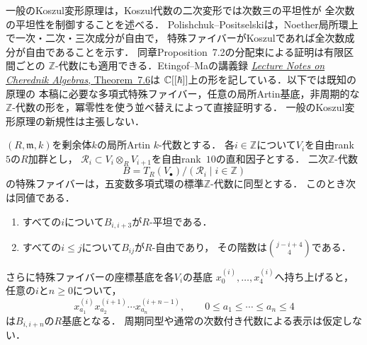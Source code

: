 一般のKoszul変形原理は，Koszul代数の二次変形では次数三の平坦性が
全次数の平坦性を制御することを述べる．
Polishchuk--Positselski\cite[Chapter~6, Theorem~7.3, pp.~129--130]{PPQuadratic}は，Noether局所環上で一次・二次・三次成分が自由で，
特殊ファイバーがKoszulであれば全次数成分が自由であることを示す．
同章Proposition~7.2の分配束による証明は有限区間ごとの
$\mathbb Z$-代数にも適用できる．Etingof--Maの講義録
\href{https://math.mit.edu/~etingof/18735.pdf}
{\emph{Lecture Notes on Cherednik Algebras}, Theorem~7.6}は
$\mathbb C[[\hbar]]$上の形を記している．以下では既知の原理の
本稿に必要な多項式特殊ファイバー，任意の局所Artin基底，非周期的な
$\mathbb Z$-代数の形を，冪零性を使う並べ替えによって直接証明する．
一般のKoszul変形原理の新規性は主張しない．

\begin{theorem}[次数三による全次数平坦性の判定]
\label{thm:abel-degree-three-propagation}
$(R,\mathfrak m,k)$を剰余体$k$の局所Artin $k$-代数とする．
各$i\in\mathbb Z$について$V_i$を自由rank~$5$の$R$加群とし，
$\mathcal R_i\subset V_i\otimes_RV_{i+1}$を自由rank~$10$の直和因子とする．
二次$\mathbb Z$-代数
\[
 B=T_R(V_\bullet)/(\mathcal R_i\mid i\in\mathbb Z)
\]
の特殊ファイバーは，五変数多項式環の標準$\mathbb Z$-代数に同型とする．
このとき次は同値である．
\begin{enumerate}[label=\textup{(\roman*)}]
\item すべての$i$について$B_{i,i+3}$が$R$-平坦である．
\item すべての$i\leq j$について$B_{ij}$が$R$-自由であり，
  その階数は$\binom{j-i+4}{4}$である．
\end{enumerate}
さらに特殊ファイバーの座標基底を各$V_i$の基底
$x_0^{(i)},\ldots,x_4^{(i)}$へ持ち上げると，任意の$i$と$n\geq0$について，
\begin{equation}\label{eq:abel-artin-ordered-basis}
 x_{a_1}^{(i)}x_{a_2}^{(i+1)}\cdots x_{a_n}^{(i+n-1)},
 \qquad 0\leq a_1\leq\cdots\leq a_n\leq4
\end{equation}
は$B_{i,i+n}$の$R$基底となる．
周期同型や通常の次数付き代数による表示は仮定しない．
\end{theorem}
